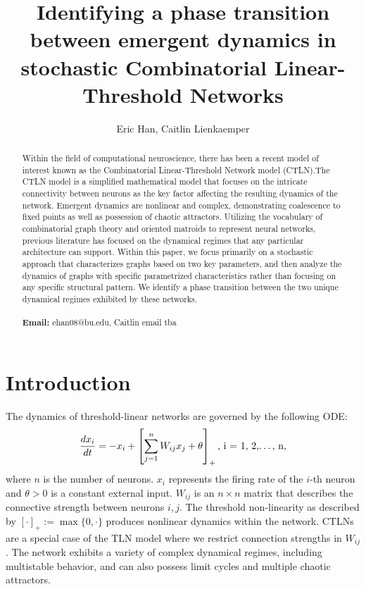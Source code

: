 \documentclass[psamsfonts]{amsart}
\title[Identifying a phase transition between emergent dynamics of stochastic CTLNs]{Identifying a phase transition between emergent dynamics in stochastic Combinatorial Linear-Threshold Networks}
\author{Eric Han, Caitlin Lienkaemper}
\theoremstyle{definition}
\theoremstyle{remark}
\numberwithin{equation}{section}
\begin{document}
\begin{abstract}
Within the field of computational neuroscience, there has been a recent model of interest known as the Combinatorial Linear-Threshold Network model (CTLN).The CTLN model is a simplified mathematical model that focuses on the intricate connectivity between neurons as the key factor affecting the resulting dynamics of the network. Emergent dynamics are nonlinear and complex, demonstrating coalescence to fixed points as well as possession of chaotic attractors. Utilizing the vocabulary of combinatorial graph theory and oriented matroids to represent neural networks, previous literature has focused on the dynamical regimes that any particular architecture can support. Within this paper, we focus primarily on a stochastic approach that characterizes graphs based on two key parameters, and then analyze the dynamics of graphs with specific parametrized characteristics rather than focusing on any specific structural pattern. We identify a phase transition between the two unique dynamical regimes exhibited by these networks.
\\\\
\noindent \textbf{Email:} ehan08@bu.edu, Caitlin email tba\\
\end{abstract}

\maketitle
\tableofcontents
\newpage

\section{Introduction}

The dynamics of threshold-linear networks are governed by the following ODE:
\[
    \frac{dx_i}{dt} = -x_i + \left[ \sum^{n}_{j=1} W_{ij} x_j + \theta \right]_+ \mbox{, i = 1, 2,\dots, n},
\]
where $n$ is the number of neurons. $x_i$ represents the firing rate of the $i$-th neuron and $\theta>0$ is a constant external input. $W_{ij}$ is an $n\times n$ matrix that describes the connective strength between neurons $i,j$. The threshold non-linearity as described by $[\cdot]_+ := \max\{0,\cdot\}$ produces nonlinear dynamics within the network. CTLNs are a special case of the TLN model where we restrict connection strengths in $W_{ij}$. The network exhibits a variety of complex dynamical regimes, including multistable behavior, and can also possess limit cycles and multiple chaotic attractors.
\end{document}
